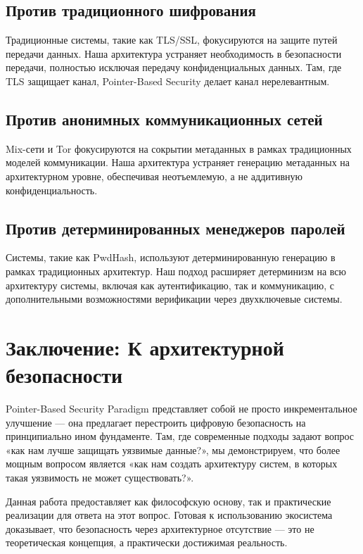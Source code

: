 \documentclass[11pt,a4paper]{article}
\begin{document}
\subsection{Против традиционного шифрования}

Традиционные системы, такие как TLS/SSL, фокусируются на защите путей передачи данных. Наша архитектура устраняет необходимость в безопасности передачи, полностью исключая передачу конфиденциальных данных. Там, где TLS защищает канал, Pointer-Based Security делает канал нерелевантным.

\subsection{Против анонимных коммуникационных сетей}

Mix-сети и Tor фокусируются на сокрытии метаданных в рамках традиционных моделей коммуникации. Наша архитектура устраняет генерацию метаданных на архитектурном уровне, обеспечивая неотъемлемую, а не аддитивную конфиденциальность.

\subsection{Против детерминированных менеджеров паролей}

Системы, такие как PwdHash, используют детерминированную генерацию в рамках традиционных архитектур. Наш подход расширяет детерминизм на всю архитектуру системы, включая как аутентификацию, так и коммуникацию, с дополнительными возможностями верификации через двухключевые системы.

\section{Заключение: К архитектурной безопасности}

Pointer-Based Security Paradigm представляет собой не просто инкрементальное улучшение — она предлагает перестроить цифровую безопасность на принципиально ином фундаменте. Там, где современные подходы задают вопрос «как нам лучше защищать уязвимые данные?», мы демонстрируем, что более мощным вопросом является «как нам создать архитектуру систем, в которых такая уязвимость не может существовать?».

Данная работа предоставляет как философскую основу, так и практические реализации для ответа на этот вопрос. Готовая к использованию экосистема доказывает, что безопасность через архитектурное отсутствие — это не теоретическая концепция, а практически достижимая реальность.
\end{document}
